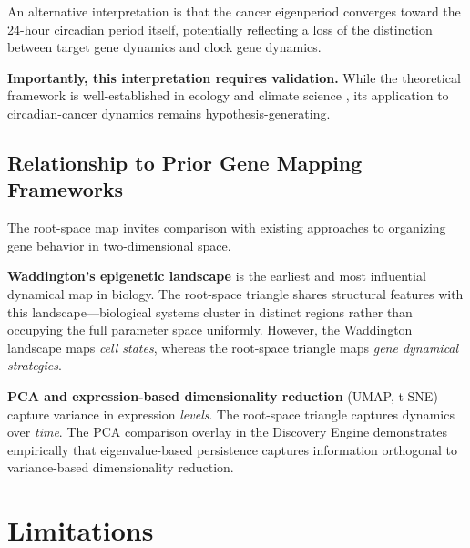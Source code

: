 \documentclass[11pt,a4paper]{article}
\begin{document}
An alternative interpretation is that the cancer eigenperiod converges toward the 24-hour circadian period itself, potentially reflecting a loss of the distinction between target gene dynamics and clock gene dynamics.

\textbf{Importantly, this interpretation requires validation.} While the theoretical framework is well-established in ecology and climate science \citep{scheffer2009early}, its application to circadian-cancer dynamics remains hypothesis-generating.

\subsection{Relationship to Prior Gene Mapping Frameworks}

The root-space map invites comparison with existing approaches to organizing gene behavior in two-dimensional space.

\textbf{Waddington's epigenetic landscape} \citep{waddington1957} is the earliest and most influential dynamical map in biology. The root-space triangle shares structural features with this landscape---biological systems cluster in distinct regions rather than occupying the full parameter space uniformly. However, the Waddington landscape maps \textit{cell states}, whereas the root-space triangle maps \textit{gene dynamical strategies}.

\textbf{PCA and expression-based dimensionality reduction} (UMAP, t-SNE) capture variance in expression \textit{levels}. The root-space triangle captures dynamics over \textit{time}. The PCA comparison overlay in the Discovery Engine demonstrates empirically that eigenvalue-based persistence captures information orthogonal to variance-based dimensionality reduction.

\section{Limitations}
\end{document}
